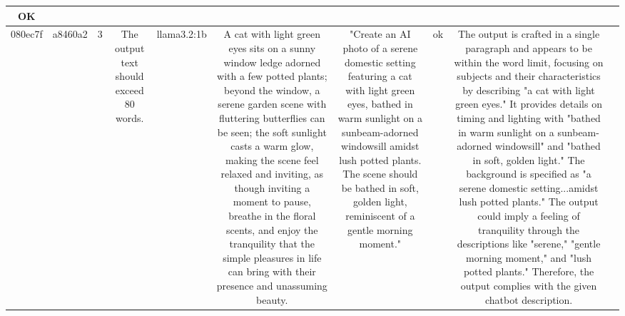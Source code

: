 \begin{table}[h!]
\begin{tabular}{|c|c|c|c|c|c|c|c|c|c|}
OK & \\
\hline
080ec7f & a8460a2 & 3 & The output text should exceed 80 words. & llama3.2:1b & A cat with light green eyes sits on a sunny window ledge adorned with a few potted plants; beyond the window, a serene garden scene with fluttering butterflies can be seen; the soft sunlight casts a warm glow, making the scene feel relaxed and inviting, as though inviting a moment to pause, breathe in the floral scents, and enjoy the tranquility that the simple pleasures in life can bring with their presence and unassuming beauty. & "Create an AI photo of a serene domestic setting featuring a cat with light green eyes, bathed in warm sunlight on a sunbeam-adorned windowsill amidst lush potted plants. The scene should be bathed in soft, golden light, reminiscent of a gentle morning moment." & ok & The output is crafted in a single paragraph and appears to be within the word limit, focusing on subjects and their characteristics by describing "a cat with light green eyes." It provides details on timing and lighting with "bathed in warm sunlight on a sunbeam-adorned windowsill" and "bathed in soft, golden light." The background is specified as "a serene domestic setting...amidst lush potted plants." The output could imply a feeling of tranquility through the descriptions like "serene," "gentle morning moment," and "lush potted plants." Therefore, the output complies with the given chatbot description.


\end{tabular}
\end{table}
